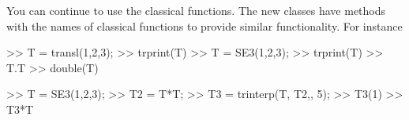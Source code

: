 \documentclass[a4paper,twoside]{report}
\begin{document}
You can continue to use the classical functions.  The new classes have methods with the names of classical functions to provide similar functionality.  For instance
\begin{Code}
>> T = transl(1,2,3);  %
>> trprint(T)  %
>> T = SE3(1,2,3);  %
>> trprint(T)  %
>> T.T   %
>> double(T) %
\end{Code}

\begin{Code}
>> T = SE3(1,2,3);  %
>> T2 = T*T;  %
>> T3 = trinterp(T, T2,, 5); %
>> T3(1)  %
>> T3*T  %
\end{Code}
\end{document}
